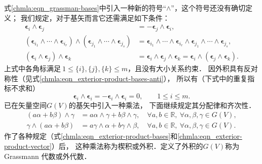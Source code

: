 式\eqref{chmla:eqn_grassman-bases}中引入一种新的符号“$\wedge$”，这个符号还没有确切定义；
我们规定，对于基矢而言它还需满足如下条件：
\begin{subequations}\label{chmla:eqn_exterior-product-bases}
\begin{align}
    \boldsymbol{\epsilon}_{i} \wedge \boldsymbol{\epsilon}_{j} &=
    -\boldsymbol{\epsilon}_{j} \wedge \boldsymbol{\epsilon}_{i},
       \label{chmla:eqn_exterior-product-bases-anti} \\
    (\boldsymbol{\epsilon}_{i_1} \wedge \cdots \wedge\boldsymbol{\epsilon}_{i_r} ) \wedge
    (\boldsymbol{\epsilon}_{j_1} \wedge \cdots \wedge\boldsymbol{\epsilon}_{j_s} ) & =
    \boldsymbol{\epsilon}_{i_1} \wedge \cdots\wedge \boldsymbol{\epsilon}_{i_r}  \wedge
    \boldsymbol{\epsilon}_{j_1} \wedge \cdots \wedge\boldsymbol{\epsilon}_{j_s},
       \label{chmla:eqn_exterior-product-tensorofbases} \\
    (\boldsymbol{\epsilon}_{i} \wedge \boldsymbol{\epsilon}_{j}) \wedge \boldsymbol{\epsilon}_{k} &=
    \boldsymbol{\epsilon}_{i} \wedge \boldsymbol{\epsilon}_{j} \wedge \boldsymbol{\epsilon}_{k}=
    \boldsymbol{\epsilon}_{i} \wedge (\boldsymbol{\epsilon}_{j} \wedge \boldsymbol{\epsilon}_{k})  .
       \label{chmla:eqn_exterior-product-bases-association}
\end{align}
\end{subequations}
上式中各角标满足$\  1 \leqslant \{i\}, \{j\}, \{k\} \leqslant m $，且没有大小关系约束．
因外积具有反对称性（见式\eqref{chmla:eqn_exterior-product-bases-anti}），
所以有（下式中的重复指标不求和）
\begin{equation}
    \boldsymbol{\epsilon}_{i} \wedge \boldsymbol{\epsilon}_{i} =
    -\boldsymbol{\epsilon}_{i} \wedge \boldsymbol{\epsilon}_{i} =0 ,
    \qquad 1 \leqslant i \leqslant m .
\end{equation}
已在矢量空间$G(V)$的基矢中引入一种{\kaishu 乘法}，
下面继续规定其分配律和齐次性．
\begin{subequations}\label{chmla:eqn_exterior-product-vector}
    \begin{align}
        (a \alpha + b\beta) \wedge \gamma &= a \alpha \wedge \gamma
        + b\beta \wedge \gamma ,  \quad \forall a,b \in \mathbb{R},
        \ \forall \alpha,\beta , \gamma\in G(V),\\
        \gamma \wedge(a \alpha + b\beta) &= a \gamma \wedge \alpha
        + b\gamma \wedge \beta ,  \quad \forall a,b \in \mathbb{R},
        \ \forall \alpha,\beta, \gamma \in G(V).
    \end{align}
\end{subequations}
作了各种规定（式\eqref{chmla:eqn_exterior-product-bases}和\eqref{chmla:eqn_exterior-product-vector}）后，
这种乘法称为{\heiti 楔积}或{\heiti 外积}．定义了外积的$G(V)$称为{Grassmann 代数}或{\heiti 外代数}．

